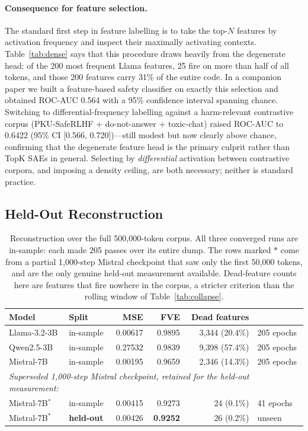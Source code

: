 \documentclass[11pt]{article}
\begin{document}
\paragraph{Consequence for feature selection.} The standard first step in feature
labelling is to take the top-$N$ features by activation frequency and inspect their
maximally activating contexts. Table~\ref{tab:dense} says that this procedure draws
heavily from the degenerate head: of the 200 most frequent Llama features, 25 fire on
more than half of all tokens, and those 200 features carry 31\% of the entire code. In a companion paper
\citep{melton2026actstream} we built a feature-based safety classifier on exactly this
selection and obtained ROC-AUC 0.564 with a 95\%
confidence interval spanning chance. Switching to differential-frequency labelling
against a harm-relevant contrastive corpus (PKU-SafeRLHF + do-not-answer + toxic-chat) raised ROC-AUC to
0.6422 (95\% CI [0.566, 0.720])---still modest but now clearly above chance, confirming that the degenerate
feature head is the primary culprit rather than TopK SAEs in general. Selecting by
\emph{differential} activation between contrastive corpora, and imposing a density
ceiling, are both necessary; neither is standard practice.

\subsection{Held-Out Reconstruction}
\label{sec:heldout}

\begin{table}[t]
  \centering
  \caption{Reconstruction over the full 500{,}000-token corpus. All three converged runs
    are in-sample: each made 205 passes over its entire dump. The rows marked $\ast$ come
    from a partial 1{,}000-step Mistral checkpoint that saw only the first 50{,}000
    tokens, and are the only genuine held-out measurement available. Dead-feature counts
    here are features that fire nowhere in the corpus, a stricter criterion than the
    rolling window of Table~\ref{tab:collapse}.}
  \label{tab:heldout}
  \smallskip
  \begin{tabular}{llrrrl}
    \toprule
    Model & Split & MSE & FVE & Dead features & \\
    \midrule
    Llama-3.2-3B & in-sample & 0.00617 & 0.9895 & 3{,}344 (20.4\%) & 205 epochs \\
    Qwen2.5-3B   & in-sample & 0.27532 & 0.9839 & 9{,}398 (57.4\%) & 205 epochs \\
    Mistral-7B   & in-sample & 0.00195 & 0.9659 & 2{,}346 (14.3\%) & 205 epochs \\
    \midrule
    \multicolumn{6}{l}{\emph{Superseded 1{,}000-step Mistral checkpoint, retained for the held-out measurement:}} \\
    Mistral-7B$^\ast$ & in-sample & 0.00415 & 0.9273 & 24 (0.1\%) & 41 epochs \\
    Mistral-7B$^\ast$ & \textbf{held-out} & 0.00426 & \textbf{0.9252} & 26 (0.2\%) & unseen \\
    \bottomrule
  \end{tabular}
\end{table}
\end{document}
